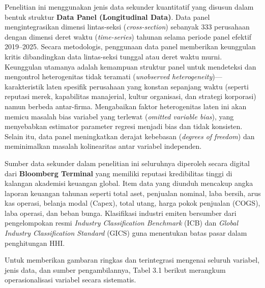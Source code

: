 \documentclass[12pt,a4paper]{article}
\begin{document}
Penelitian ini menggunakan jenis data sekunder kuantitatif yang disusun
dalam bentuk struktur \textbf{Data Panel (Longitudinal Data)}. Data
panel mengintegrasikan dimensi lintas-seksi (\emph{cross-section})
sebanyak 333 perusahaan dengan dimensi deret waktu (\emph{time-series})
tahunan selama periode panel efektif 2019--2025. Secara metodologis,
penggunaan data panel memberikan keunggulan kritis dibandingkan data
lintas-seksi tunggal atau deret waktu murni. Keunggulan utamanya adalah
kemampuan struktur panel untuk mendeteksi dan mengontrol heterogenitas
tidak teramati (\emph{unobserved heterogeneity})---karakteristik laten
spesifik perusahaan yang konstan sepanjang waktu (seperti reputasi
merek, kapabilitas manajerial, kultur organisasi, dan strategi
korporasi) namun berbeda antar-firma. Mengabaikan faktor heterogenitas
laten ini akan memicu masalah bias variabel yang terlewat (\emph{omitted
variable bias}), yang menyebabkan estimator parameter regresi menjadi
bias dan tidak konsisten. Selain itu, data panel meningkatkan derajat
kebebasan (\emph{degrees of freedom}) dan meminimalkan masalah
kolinearitas antar variabel independen.

Sumber data sekunder dalam penelitian ini seluruhnya diperoleh secara
digital dari \textbf{Bloomberg Terminal} yang memiliki reputasi
kredibilitas tinggi di kalangan akademisi keuangan global. Item data
yang diunduh mencakup angka laporan keuangan tahunan seperti total aset,
penjualan nominal, laba bersih, arus kas operasi, belanja modal (Capex),
total utang, harga pokok penjualan (COGS), laba operasi, dan beban
bunga. Klasifikasi industri emiten bersumber dari pengelompokan resmi
\emph{Industry Classification Benchmark} (ICB) dan \emph{Global Industry
Classification Standard} (GICS) guna menentukan batas pasar dalam
penghitungan HHI.

Untuk memberikan gambaran ringkas dan terintegrasi mengenai seluruh
variabel, jenis data, dan sumber pengambilannya, Tabel 3.1 berikut
merangkum operasionalisasi variabel secara sistematis.
\end{document}

